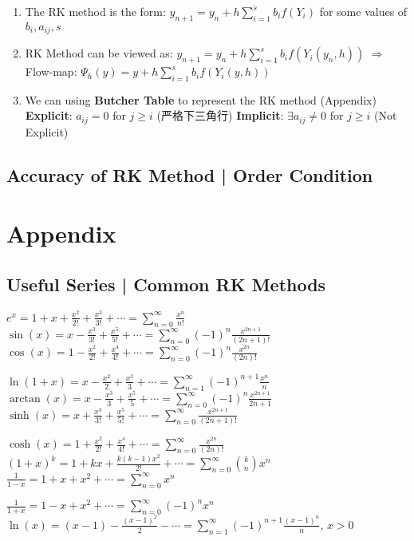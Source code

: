 \documentclass[9pt]{article}
\begin{document}
\begin{enumerate}[itemsep=-2pt, topsep=-2pt]
    \item The RK method is the form: $y_{n+1}=y_n+h\sum_{i=1}^{s}b_if(Y_i)$ \quad for some values of $b_i,a_{ij},s$
    \item RK Method can be viewed as: $y_{n+1}=y_n+h\sum_{i=1}^{s}b_if(Y_{i}(y_n,h))$ \quad $\Rightarrow$ \quad Flow-map: $\Psi_{h}(y)=y+h\sum_{i=1}^{s}b_if(Y_{i}(y,h))$
    \item \small{{\scriptsize We can using \textbf{Butcher Table} to represent the RK method (Appendix)} \quad \textbf{Explicit}: $a_{ij}=0$ for $j\geq i$ {\scriptsize (严格下三角行)} \quad \textbf{Implicit}: $\exists a_{ij}\ne0$ for $j\geq i$ {\scriptsize (Not Explicit)}}
\end{enumerate}


\subsection{Accuracy of RK Method | Order Condition} %



\section{Appendix} 

\subsection{Useful Series | Common RK Methods} %
\small{
$e^x = 1 + x + \frac{x^2}{2!} + \frac{x^3}{3!} + \cdots  = \sum_{n=0}^\infty \frac{x^n}{n!}$ \quad $ \sin(x) = x - \frac{x^3}{3!} + \frac{x^5}{5!} + \cdots = \sum_{n=0}^\infty (-1)^n \frac{x^{2n+1}}{(2n+1)!} $ \quad $\cos(x) = 1 - \frac{x^2}{2!} + \frac{x^4}{4!} + \cdots = \sum_{n=0}^\infty (-1)^n \frac{x^{2n}}{(2n)!}$

$\ln(1+x) = x - \frac{x^2}{2} + \frac{x^3}{3}  + \cdots = \sum_{n=1}^\infty (-1)^{n+1} \frac{x^n}{n}$ \quad $\arctan(x) = x - \frac{x^3}{3} + \frac{x^5}{5} + \cdots = \sum_{n=0}^\infty (-1)^n \frac{x^{2n+1}}{2n+1}$ \quad $\sinh(x) = x + \frac{x^3}{3!} + \frac{x^5}{5!} + \cdots = \sum_{n=0}^\infty \frac{x^{2n+1}}{(2n+1)!}$

$\cosh(x) = 1 + \frac{x^2}{2!} + \frac{x^4}{4!} + \cdots = \sum_{n=0}^\infty \frac{x^{2n}}{(2n)!}$  \quad $(1+x)^k = 1 + kx + \frac{k(k-1)x^2}{2!} + \cdots = \sum_{n=0}^\infty \binom{k}{n} x^n$ $\frac{1}{1-x} = 1 + x + x^2  + \cdots = \sum_{n=0}^\infty x^n $ 

$\frac{1}{1+x} = 1 - x + x^2  + \cdots = \sum_{n=0}^\infty (-1)^n x^n$ \quad $\ln(x) = (x-1) - \frac{(x-1)^2}{2} - \cdots = \sum_{n=1}^\infty (-1)^{n+1} \frac{(x-1)^n}{n}, \, x > 0$
}
\end{document}
